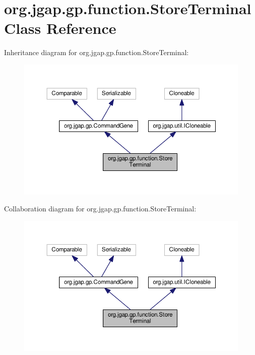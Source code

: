 \hypertarget{classorg_1_1jgap_1_1gp_1_1function_1_1_store_terminal}{\section{org.\-jgap.\-gp.\-function.\-Store\-Terminal Class Reference}
\label{classorg_1_1jgap_1_1gp_1_1function_1_1_store_terminal}
}


Inheritance diagram for org.\-jgap.\-gp.\-function.\-Store\-Terminal\-:
\nopagebreak
\begin{figure}[H]
\begin{center}
\leavevmode
\includegraphics[width=350pt]{classorg_1_1jgap_1_1gp_1_1function_1_1_store_terminal__inherit__graph}
\end{center}
\end{figure}


Collaboration diagram for org.\-jgap.\-gp.\-function.\-Store\-Terminal\-:
\nopagebreak
\begin{figure}[H]
\begin{center}
\leavevmode
\includegraphics[width=350pt]{classorg_1_1jgap_1_1gp_1_1function_1_1_store_terminal__coll__graph}
\end{center}
\end{figure}
